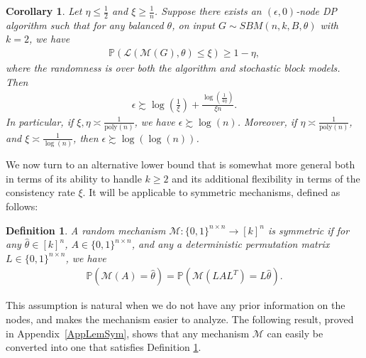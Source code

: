 \documentclass{article}
\newtheorem{remark}{Remark}
\newtheorem{definition}{Definition}
\newtheorem{corollary}{Corollary}
\newcommand{\mprob}{\mathbb{P}}
\newcommand{\calM}{\mathcal{M}}
\begin{document}
\begin{corollary}
\label{cor:LB_Chen_pure}
Let $\eta \leq \frac{1}{2}$ and $\xi \geq\frac{1}{n}$. Suppose there exists an $(\epsilon, 0)$-node DP algorithm such that for any balanced $\theta$, on input $G \sim SBM(n, k, B, \theta)$ with $k=2$, we have  
\begin{align*}
\mathbb{P}(\mathcal{L}(\mathcal{M}(G), \theta) \leq \xi) \geq 1 - \eta,
\end{align*}
where the randomness is over both the algorithm and stochastic block models. Then
\begin{align*}
\epsilon \succsim \log\left(\frac{1}{\xi}\right) + \frac{\log\left(\frac{1}{4\eta}\right)}{\xi n}.
\end{align*}
In particular, if $\xi, \eta \asymp \frac{1}{\mathrm{poly}(n)}$, we have $\epsilon \succsim \log(n)$. Moreover, if $\eta \asymp \frac{1}{\mathrm{poly}(n)}$, and $\xi \asymp \frac{1}{\log(n)}$, then $\epsilon \succsim \log(\log(n))$.
\end{corollary}


We now turn to an alternative lower bound that is somewhat more general both in terms of its ability to handle $k \ge 2$ and its additional flexibility in terms of the consistency rate $\xi$. It will be applicable to symmetric mechanisms, defined as follows:

\begin{definition}
\label{def:Symm_Mech}
A random mechanism $\calM: \{0, 1\}^{n\times n} \rightarrow [k]^n$ is \textit{symmetric} if for any $\hat{\theta} \in [k]^n$, $A\in \{0,1\}^{n\times n}$, and any a deterministic permutation matrix $L \in \{0, 1\}^{n \times n}$, we have
\begin{align*}
    \mathbb{P}(\calM(A) = \hat{\theta}) = \mprob(\calM(LAL^T) = L\hat{\theta}).
\end{align*}
\end{definition}

This assumption is natural when we do not have any prior information on the nodes, and makes the mechanism easier to analyze. The following result, proved in Appendix~\ref{AppLemSym}, shows that any mechanism $\mathcal{M}$ can easily be converted into one that satisfies Definition \ref{def:Symm_Mech}.
\end{document}
